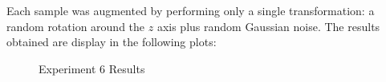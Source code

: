 \documentclass[11pt,a4paper]{article}
\begin{document}
\noindent
Each sample was augmented by performing only a single transformation: a random rotation around the $z$ axis plus random Gaussian noise. The results obtained are display in the following plots:
\begin{figure}[H]
    \centering
    \qquad
    \caption{Experiment 6 Results}
\end{figure}
\end{document}
